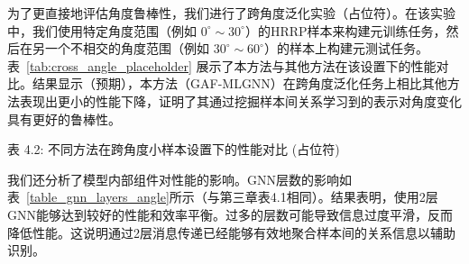 为了更直接地评估角度鲁棒性，我们进行了跨角度泛化实验（占位符）。在该实验中，我们使用特定角度范围（例如 $0^\circ \sim 30^\circ$）的HRRP样本来构建元训练任务，然后在另一个不相交的角度范围（例如 $30^\circ \sim 60^\circ$）的样本上构建元测试任务。表~\ref{tab:cross_angle_placeholder} 展示了本方法与其他方法在该设置下的性能对比。结果显示（预期），本方法（GAF-MLGNN）在跨角度泛化任务上相比其他方法表现出更小的性能下降，证明了其通过挖掘样本间关系学习到的表示对角度变化具有更好的鲁棒性。

\begin{table}[h!]
    \centering
    \captionsetup{labelformat=empty, textformat=empty} %
    \caption*{表 4.2: 不同方法在跨角度小样本设置下的性能对比 (占位符)}
    \label{tab:cross_angle_placeholder}
\end{table}

我们还分析了模型内部组件对性能的影响。GNN层数的影响如表~\ref{table_gnn_layers_angle}所示（与第三章表4.1相同）。结果表明，使用2层GNN能够达到较好的性能和效率平衡。过多的层数可能导致信息过度平滑，反而降低性能。这说明通过2层消息传递已经能够有效地聚合样本间的关系信息以辅助识别。

